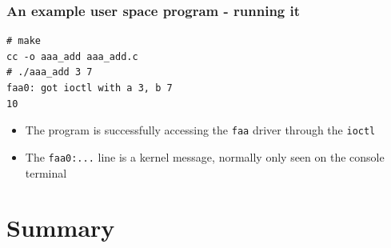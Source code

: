 \documentclass[dvipsnames,table]{beamer}
\begin{document}
\begin{frame}[fragile]
\frametitle{An example user space program - running it}
\begin{verbatim}
# make
cc -o aaa_add aaa_add.c
# ./aaa_add 3 7
faa0: got ioctl with a 3, b 7
10
\end{verbatim}
\begin{itemize}
	\item The program is successfully accessing the {\tt faa} driver through the {\tt ioctl}	
	\item The {\tt faa0:...} line is a kernel message, normally only seen on the console terminal
\end{itemize}
\end{frame}

\section{Summary}
\end{document}
